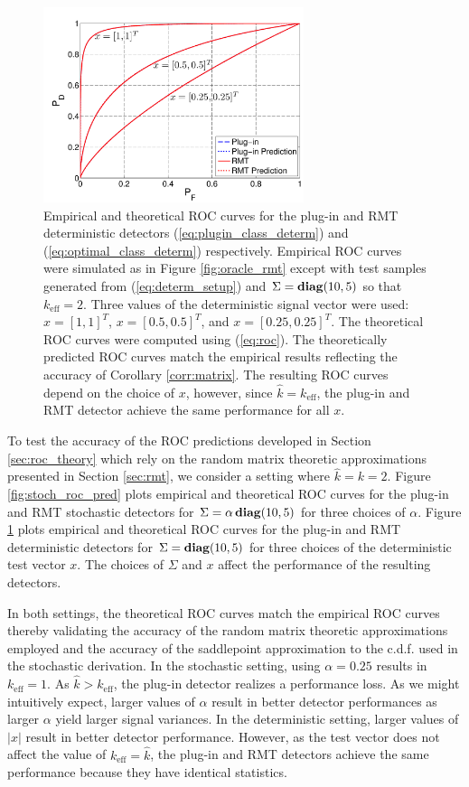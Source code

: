 \begin{figure}
\centering
\includegraphics[width=3in]{figures/determ_roc_pred.pdf}
\caption{Empirical and theoretical ROC curves for the plug-in and RMT deterministic detectors (\ref{eq:plugin_class_determ}) and (\ref{eq:optimal_class_determ}) respectively. Empirical ROC curves were simulated as in Figure \ref{fig:oracle_rmt} except with test samples generated from (\ref{eq:determ_setup}) and $\Sigma=\mathop{\bf diag}(10,5)$ so that $k_{\text{eff}} = 2$. Three values of the deterministic signal vector were used: $x=[1,1]^T$, $x=[0.5,0.5]^T$, and $x=[0.25,0.25]^T$. The theoretical ROC curves were computed using (\ref{eq:roc}). The theoretically predicted ROC curves match the empirical results reflecting the accuracy of Corollary \ref{corr:matrix}. The resulting ROC curves depend on the choice of $x$, however, since $\widehat{k} = k_{\text{eff}}$, the plug-in and RMT detector achieve the same performance for all $x$.}
\label{fig:determ_roc_pred}
\end{figure}

To test the accuracy of the ROC predictions developed in Section \ref{sec:roc_theory} which rely on the random matrix theoretic approximations presented in Section \ref{sec:rmt}, we consider a setting where $\widehat{k}=k = 2$. Figure \ref{fig:stoch_roc_pred} plots empirical and theoretical ROC curves for the plug-in and RMT stochastic detectors for $\Sigma=\alpha\mathop{\bf diag}(10,5)$ for three choices of $\alpha$. Figure \ref{fig:determ_roc_pred} plots empirical and theoretical ROC curves for the plug-in and RMT deterministic detectors for $\Sigma=\mathop{\bf diag}(10,5)$ for three choices of the deterministic test vector $x$. The choices of $\Sigma$ and $x$ affect the performance of the resulting detectors.

In both settings, the theoretical ROC curves match the empirical ROC curves thereby validating the accuracy of the random matrix theoretic approximations employed and the accuracy of the saddlepoint approximation to the c.d.f. used in the stochastic derivation. In the stochastic setting, using $\alpha=0.25$ results in $k_\text{eff}=1$. As $\widehat{k}>k_\text{eff}$, the plug-in detector realizes a performance loss. As we might intuitively expect, larger values of $\alpha$ result in better detector performances as larger $\alpha$ yield larger signal variances. In the deterministic setting, larger values of $|x|$ result in better detector performance. However, as the test vector does not affect the value of $k_\text{eff}=\widehat{k}$, the plug-in and RMT detectors achieve the same performance because they have identical statistics.


